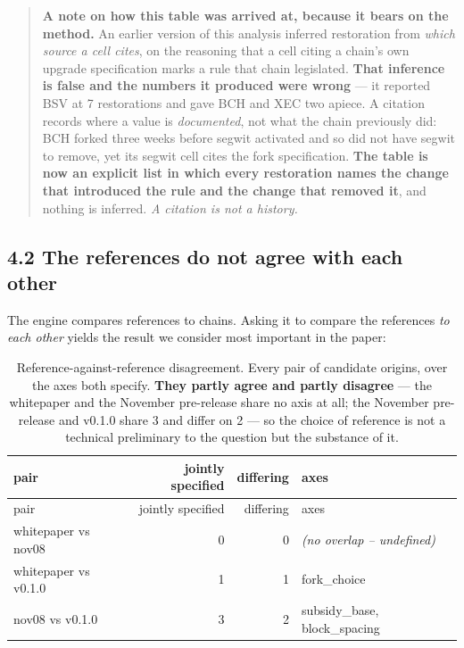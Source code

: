 \documentclass[
]{article}
\begin{document}
\begin{quote}
\textbf{A note on how this table was arrived at, because it bears on the
method.} An earlier version of this analysis inferred restoration from
\emph{which source a cell cites}, on the reasoning that a cell citing a
chain's own upgrade specification marks a rule that chain legislated.
\textbf{That inference is false and the numbers it produced were wrong}
--- it reported BSV at 7 restorations and gave BCH and XEC two apiece. A
citation records where a value is \emph{documented}, not what the chain
previously did: BCH forked three weeks before segwit activated and so
did not have segwit to remove, yet its segwit cell cites the fork
specification. \textbf{The table is now an explicit list in which every
restoration names the change that introduced the rule and the change
that removed it}, and nothing is inferred. \emph{A citation is not a
history.}
\end{quote}

\subsection{4.2 The references do not agree with each
other}\label{the-references-do-not-agree-with-each-other}

The engine compares references to chains. Asking it to compare the
references \emph{to each other} yields the result we consider most
important in the paper:

\begin{longtable}[]{@{}lrrl@{}}
\caption{Reference-against-reference disagreement. Every pair of
candidate origins, over the axes both specify. \textbf{They partly agree
and partly disagree} --- the whitepaper and the November pre-release
share no axis at all; the November pre-release and v0.1.0 share 3 and
differ on 2 --- so the choice of reference is not a technical
preliminary to the question but the substance of it.}\tabularnewline
\toprule\noalign{}
pair & jointly specified & differing & axes \\
\midrule\noalign{}
\endfirsthead
\toprule\noalign{}
pair & jointly specified & differing & axes \\
\midrule\noalign{}
\endhead
\bottomrule\noalign{}
\endlastfoot
whitepaper vs nov08 & 0 & 0 & \emph{(no overlap -- undefined)} \\
whitepaper vs v0.1.0 & 1 & 1 & fork\_choice \\
nov08 vs v0.1.0 & 3 & 2 & subsidy\_base, block\_spacing \\
\end{longtable}
\end{document}
